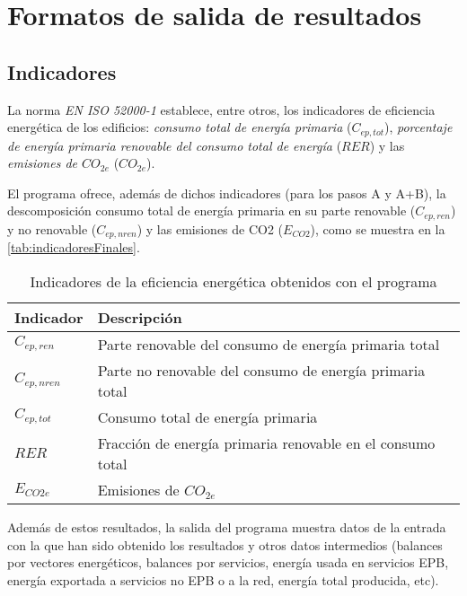 \documentclass[10pt,notitlepage,oneside,a4paper]{article}
\begin{document}
\clearpage
\newpage
\section{Formatos de salida de resultados}\label{sec:formatosalida}

\subsection{Indicadores}

La norma \textit{EN ISO 52000-1} establece, entre otros, los indicadores de eficiencia energética de los edificios: \textit{consumo total de energía primaria} (\texttt{$C_{ep,tot}$}), \textit{porcentaje de energía primaria renovable del consumo total de energía} (\texttt{$RER$}) y las \textit{emisiones de $CO_{2e}$} (\texttt{$CO_{2e}$}).

El programa ofrece, además de dichos indicadores (para los pasos A y A+B), la descomposición consumo total de energía primaria en su parte renovable (\texttt{$C_{ep,ren}$}) y no renovable (\texttt{$C_{ep,nren}$}) y las emisiones de CO2 (\texttt{$E_{CO2}$}), como se muestra en la \autoref{tab:indicadoresFinales}.

\begin{table}[H]
\centering
\small
\caption{Indicadores de la eficiencia energética obtenidos con el programa}\label{tab:indicadoresFinales}
\begin{tabular}{ll}
    \toprule
    \textbf{Indicador} & \textbf{Descripción}\\
    \midrule
    $C_{ep,ren}$ & Parte renovable del consumo de energía primaria total\\
    $C_{ep,nren}$& Parte no renovable del consumo de energía primaria total\\
    $C_{ep,tot}$ & Consumo total de energía primaria\\
    $RER$      & Fracción de energía primaria renovable en el consumo total\\
    $E_{CO2e}$ & Emisiones de $CO_{2e}$\\
    \bottomrule
\end{tabular}
\end{table}

Además de estos resultados, la salida del programa muestra datos de la entrada con la que han sido obtenido los resultados y otros datos intermedios (balances por vectores energéticos, balances por servicios, energía usada en servicios EPB, energía exportada a servicios no EPB o a la red, energía total producida, etc).
\end{document}
